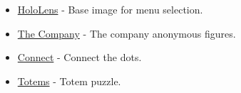\documentclass[12pt]{article}
\begin{document}
\begin{itemize}
\item \href{http://img-2.newatlas.com/microsoft-hololens.jpg?auto=format\%2Ccompress\&ch=Width\%2CDPR\&crop=entropy\&fit=crop\&h=347\&q=60\&w=616\&s=63631a238d01aeb6b842d3c31b3898eb}{HoloLens} - Base image for menu selection.
\item \href{https://img.clipartfest.com/b7559eb47d8ee1fe0e3831da8005a24a\_-vehicles-for-businessman-clipart-of-a-businessman-silhouette\_1080-1080.jpeg}{The Company} - The company anonymous figures.
\item \href{https://cdn.dottodots.net/samples/Cat\_7\_Dot-To-Dot.png}{Connect} - Connect the dots.
\item \href{https://gaming.stackexchange.com/questions/34061/whats-the-right-position-of-each-of-the-armors-in-the-chateau}{Totems} - Totem puzzle.
\end{itemize}
\end{document}
